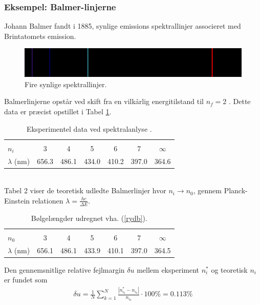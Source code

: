 \documentclass[12pt]{article}
\theoremstyle{definition}
\theoremstyle{remark}
\theoremstyle{definition}
\numberwithin{equation}{section}
\begin{document}
\subsubsection{Eksempel: Balmer-linjerne}
Johann Balmer fandt i 1885, synlige emissions spektrallinjer associeret med Brintatomets emission.
\begin{figure}[!h]
    \centering
    \includegraphics[width=\textwidth]{1920px-Emission_spectrum-H.svg.png}
    \caption{Fire synlige spektrallinjer.}
    \label{fig:my_label}
\end{figure}
Balmerlinjerne opstår ved skift fra en vilkårlig energitilstand til $n_f=2$ \parencite{wiese}. Dette data er præcist opstillet i Tabel \ref{tab:eksp}. 
\begin{table}[!h]
\label{tab:eksp}
    \centering
    \begin{tabular}{|l|cccccc}
    \hline\\
    $n_i$ & 3 & 4 & 5 & 6 & 7 & $\infty$ \\
    $\lambda$ (nm) & 656.3 & 486.1 & 434.0 & 410.2 & 397.0 & 364.6 
    \end{tabular}
    \caption{Eksperimentel data ved spektralanlyse \parencite{wiese}.}
\end{table}\\
Tabel 2 viser de teoretisk udledte Balmerlinjer hvor $\displaystyle n_i\to n_0$, gennem Planck-Einstein relationen $\displaystyle\lambda=\frac{hc}{\Delta E}$.
\begin{table}[!h]
\label{tab:teor}
    \centering
    \begin{tabular}{|l|cccccc}
        \hline\\
    $n_0$ & 3 & 4 & 5 & 6 & 7 & $\infty$ \\
    $\lambda$ (nm) & 656.1 & 486.1 & 433.9 & 410.1 & 397.0 & 364.5
    \end{tabular}
    \caption{Bølgelængder udregnet vha. (\ref{rydb}).}
\end{table}

Den gennemsnitlige relative fejlmargin $\delta u$ mellem eksperiment $n_i^*$ og teoretisk $n_i$ er fundet som
\begin{align}
    \delta u = \frac{1}{N}\sum^N_{k=1} \frac{\left| n_{i_k}^* - n_{i_k}\right|}{n_{i_k}}\cdot 100\% = 0.113\%
\end{align}
\end{document}
